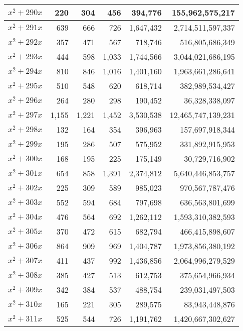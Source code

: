 \documentclass[a4paper]{amsproc}
\theoremstyle{plain}
\begin{document}
\begin{longtable}{ | l | r | r | r | r | r | }
$x^2 + 290x$ & 220 & 304 & 456 & 394{,}776 & 155{,}962{,}575{,}217 \\ \hline
$x^2 + 291x$ & 639 & 666 & 726 & 1{,}647{,}432 & 2{,}714{,}511{,}597{,}337 \\ \hline
$x^2 + 292x$ & 357 & 471 & 567 & 718{,}746 & 516{,}805{,}686{,}349 \\ \hline
$x^2 + 293x$ & 444 & 598 & 1{,}033 & 1{,}744{,}566 & 3{,}044{,}021{,}686{,}195 \\ \hline
$x^2 + 294x$ & 810 & 846 & 1{,}016 & 1{,}401{,}160 & 1{,}963{,}661{,}286{,}641 \\ \hline
$x^2 + 295x$ & 510 & 548 & 620 & 618{,}714 & 382{,}989{,}534{,}427 \\ \hline
$x^2 + 296x$ & 264 & 280 & 298 & 190{,}452 & 36{,}328{,}338{,}097 \\ \hline
$x^2 + 297x$ & 1{,}155 & 1{,}221 & 1{,}452 & 3{,}530{,}538 & 12{,}465{,}747{,}139{,}231 \\ \hline
$x^2 + 298x$ & 132 & 164 & 354 & 396{,}963 & 157{,}697{,}918{,}344 \\ \hline
$x^2 + 299x$ & 195 & 286 & 507 & 575{,}952 & 331{,}892{,}915{,}953 \\ \hline
$x^2 + 300x$ & 168 & 195 & 225 & 175{,}149 & 30{,}729{,}716{,}902 \\ \hline
$x^2 + 301x$ & 654 & 858 & 1{,}391 & 2{,}374{,}812 & 5{,}640{,}446{,}853{,}757 \\ \hline
$x^2 + 302x$ & 225 & 309 & 589 & 985{,}023 & 970{,}567{,}787{,}476 \\ \hline
$x^2 + 303x$ & 552 & 594 & 684 & 797{,}698 & 636{,}563{,}801{,}699 \\ \hline
$x^2 + 304x$ & 476 & 564 & 692 & 1{,}262{,}112 & 1{,}593{,}310{,}382{,}593 \\ \hline
$x^2 + 305x$ & 370 & 472 & 615 & 682{,}794 & 466{,}415{,}898{,}607 \\ \hline
$x^2 + 306x$ & 864 & 909 & 969 & 1{,}404{,}787 & 1{,}973{,}856{,}380{,}192 \\ \hline
$x^2 + 307x$ & 411 & 437 & 992 & 1{,}436{,}856 & 2{,}064{,}996{,}279{,}529 \\ \hline
$x^2 + 308x$ & 385 & 427 & 513 & 612{,}753 & 375{,}654{,}966{,}934 \\ \hline
$x^2 + 309x$ & 342 & 384 & 537 & 488{,}754 & 239{,}031{,}497{,}503 \\ \hline
$x^2 + 310x$ & 165 & 221 & 305 & 289{,}575 & 83{,}943{,}448{,}876 \\ \hline
$x^2 + 311x$ & 525 & 544 & 726 & 1{,}191{,}762 & 1{,}420{,}667{,}302{,}627 \\ \hline

\end{longtable}
\end{document}
